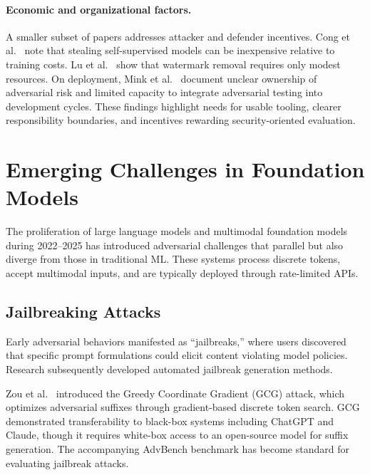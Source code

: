 \documentclass[11pt,a4paper]{article}
\begin{document}
\paragraph{Economic and organizational factors.}
A smaller subset of papers addresses attacker and defender incentives. Cong et al.~\citep{cong2022sslguard} note that stealing self-supervised models can be inexpensive relative to training costs. Lu et al.~\citep{lu2024neural} show that watermark removal requires only modest resources. On deployment, Mink et al.~\citep{mink2023barriers} document unclear ownership of adversarial risk and limited capacity to integrate adversarial testing into development cycles. These findings highlight needs for usable tooling, clearer responsibility boundaries, and incentives rewarding security-oriented evaluation.

\section{Emerging Challenges in Foundation Models}

The proliferation of large language models and multimodal foundation models during 2022--2025 has introduced adversarial challenges that parallel but also diverge from those in traditional ML. These systems process discrete tokens, accept multimodal inputs, and are typically deployed through rate-limited APIs.

\subsection{Jailbreaking Attacks}

Early adversarial behaviors manifested as ``jailbreaks,'' where users discovered that specific prompt formulations could elicit content violating model policies. Research subsequently developed automated jailbreak generation methods.

Zou et al.~\citep{zou2023universal} introduced the Greedy Coordinate Gradient (GCG) attack, which optimizes adversarial suffixes through gradient-based discrete token search. GCG demonstrated transferability to black-box systems including ChatGPT and Claude, though it requires white-box access to an open-source model for suffix generation. The accompanying AdvBench benchmark has become standard for evaluating jailbreak attacks.
\end{document}
